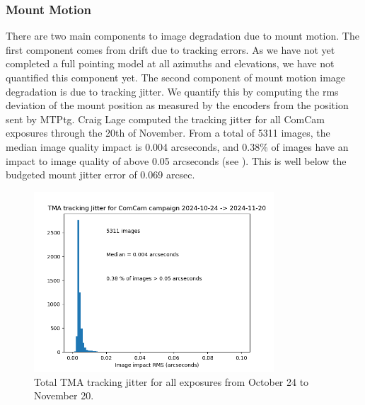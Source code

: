 \subsubsection{Mount Motion}

There are two main components to image degradation due to mount motion. The first component comes from drift due to tracking errors. As we have not yet completed a full pointing model at all azimuths and elevations, we have not quantified this component yet. The second component of mount motion image degradation is due to tracking jitter. We quantify this by computing the rms deviation of the mount position as measured by the encoders from the position sent by MTPtg. Craig Lage computed the tracking jitter for all ComCam exposures through the 20th of November. From a total of 5311 images, the median image quality impact is 0.004 arcseconds, and 0.38\% of images have an impact to image quality of above 0.05 arcseconds (see ). This is well below the budgeted mount jitter error of 0.069 arcsec.

\begin{figure}
  \begin{center}
    \includegraphics[width=0.8\textwidth]{image_quality_figures/ComCam_Mount_Jitter_21Nov24.png}
  \end{center}
  \caption{Total TMA tracking jitter for all exposures from October 24 to November 20.}
  \label{fig:jitter}
\end{figure}

